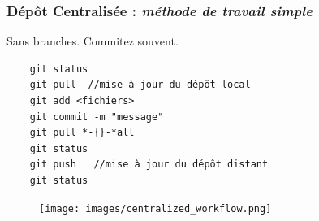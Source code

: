 \documentclass[table,tikz,12pt,svgnames]{beamer}
\begin{document}

\begin{frame}[fragile]
\frametitle{Dépôt Centralisée :\textit{ méthode de travail \textbf{simple}}}
\begin{adjustwidth}{-1em}{0cm}{}
\vspace{-3.5em}
\color{darkgreen}%
Sans branches. Commitez souvent.\\
\color{black}

\vspace{-0.5em}
\vspace{-1em}
\begin{verbatim}
	git status
	git pull  //mise à jour du dépôt local
	git add <fichiers>      
	git commit -m "message"
	git pull *-{}-*all
	git status
	git push   //mise à jour du dépôt distant
	git status
\end{verbatim}
\vspace{-2.5em}
\end{adjustwidth}
\vspace{-16em}
\begin{adjustwidth}{-0cm}{-1cm}{}
	\begin{figure}
		\hfill
		\texttt{[image: images/centralized\_workflow.png]}
	\end{figure}
\end{adjustwidth}
\end{frame}
\end{document}
